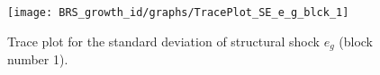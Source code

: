 \begin{figure}[H]
\centering
  \texttt{[image: BRS\_growth\_id/graphs/TracePlot\_SE\_e\_g\_blck\_1]}\\
    \caption{Trace plot for the standard deviation of structural shock ${e_g}$ (block number 1).}
\end{figure}
